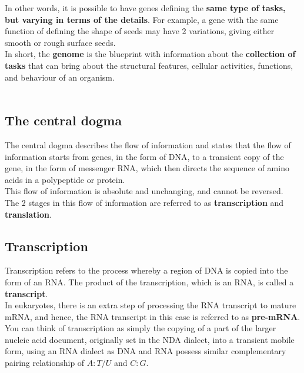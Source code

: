 \documentclass[11pt]{article}
\begin{document}
In other words, it is possible to have genes defining the \textbf{same type of tasks, but varying in terms of the details}. For example, a gene with the same function of defining the shape of seeds may have 2 variations, giving either smooth or rough surface seeds.
\\[0pt]

In short, the \textbf{genome} is the blueprint with information about the \textbf{collection of tasks} that can bring about the structural features, cellular activities, functions, and behaviour of an organism.
\\[0pt]
\\[0pt]

\subsection{The central dogma}
\label{sec:orgb77299d}
The central dogma describes the flow of information and states that the flow of information starts from genes, in the form of DNA, to a transient copy of the gene, in the form of messenger RNA, which then directs the sequence of amino acids in a polypeptide or protein.
\\[0pt]

This flow of information is absolute and unchanging, and cannot be reversed.
\\[0pt]

The 2 stages in this flow of information are referred to as \textbf{transcription} and \textbf{translation}.

\newpage

\subsection{Transcription}
\label{sec:org61c29d0}
Transcription refers to the process whereby a region of DNA is copied into the form of an RNA. The product of the transcription, which is an RNA, is called a \textbf{transcript}.
\\[0pt]

In eukaryotes, there is an extra step of processing the RNA transcript to mature mRNA, and hence, the RNA transcript in this case is referred to as \textbf{pre-mRNA}.
\\[0pt]

You can think of transcription as simply the copying of a part of the larger nucleic acid document, originally set in the NDA dialect, into a transient mobile form, using an RNA dialect as DNA and RNA possess similar complementary pairing relationship of \(A:T/U\) and \(C:G\).
\end{document}
